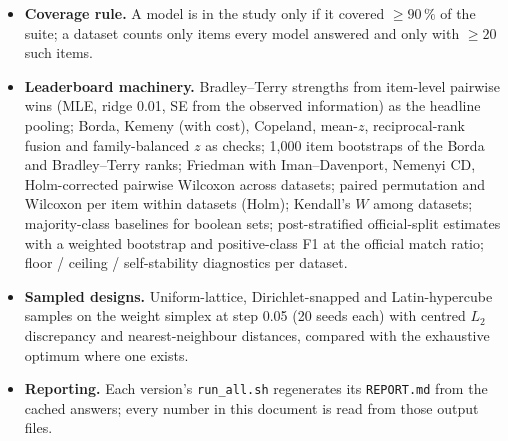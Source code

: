 \documentclass[11pt]{article}
\begin{document}
\begin{itemize}
\item \textbf{Coverage rule.} A model is in the study only if it covered $\ge 90\,\%$ of the suite; a dataset counts only items every model answered and only with $\ge 20$ such items.
\item \textbf{Leaderboard machinery.} Bradley--Terry strengths from item-level pairwise wins (MLE, ridge 0.01, SE from the observed information) as the headline pooling; Borda, Kemeny (with cost), Copeland, mean-$z$, reciprocal-rank fusion and family-balanced $z$ as checks; 1,000 item bootstraps of the Borda and Bradley--Terry ranks; Friedman with Iman--Davenport, Nemenyi CD, Holm-corrected pairwise Wilcoxon across datasets; paired permutation and Wilcoxon per item within datasets (Holm); Kendall's $W$ among datasets; majority-class baselines for boolean sets; post-stratified official-split estimates with a weighted bootstrap and positive-class F1 at the official match ratio; floor / ceiling / self-stability diagnostics per dataset.
\item \textbf{Sampled designs.} Uniform-lattice, Dirichlet-snapped and Latin-hypercube samples on the weight simplex at step 0.05 (20 seeds each) with centred $L_2$ discrepancy and nearest-neighbour distances, compared with the exhaustive optimum where one exists.
\item \textbf{Reporting.} Each version's \texttt{run\_all.sh} regenerates its \texttt{REPORT.md} from the cached answers; every number in this document is read from those output files.
\end{itemize}
\end{document}
